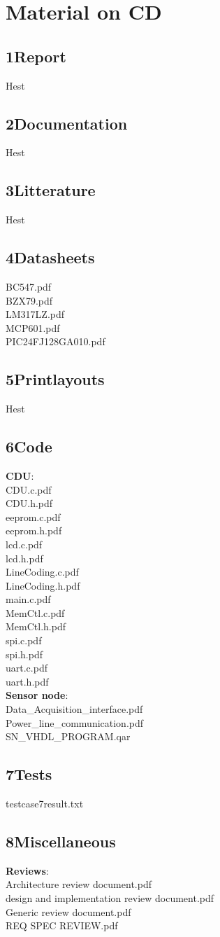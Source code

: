\chapter{Material on CD}
\section{1Report}
Hest
\section{2Documentation}
Hest
\section{3Litterature}
Hest
\section{4Datasheets}
BC547.pdf\\
BZX79.pdf\\
LM317LZ.pdf\\
MCP601.pdf\\
PIC24FJ128GA010.pdf\\
\section{5Printlayouts}
Hest
\section{6Code}
\textbf{CDU}:\\
CDU.c.pdf\\
CDU.h.pdf\\
eeprom.c.pdf\\
eeprom.h.pdf\\
lcd.c.pdf\\
lcd.h.pdf\\
LineCoding.c.pdf\\
LineCoding.h.pdf\\
main.c.pdf\\
MemCtl.c.pdf\\
MemCtl.h.pdf\\
spi.c.pdf\\
spi.h.pdf\\
uart.c.pdf\\
uart.h.pdf\\
\textbf{Sensor node}:\\
Data_Acquisition_interface.pdf\\
Power_line_communication.pdf\\
SN_VHDL_PROGRAM.qar\\
\section{7Tests}
testcase7result.txt\\
\section{8Miscellaneous}
\textbf{Reviews}:\\
Architecture review document.pdf\\
design and implementation review document.pdf\\
Generic review document.pdf\\
REQ SPEC REVIEW.pdf\\